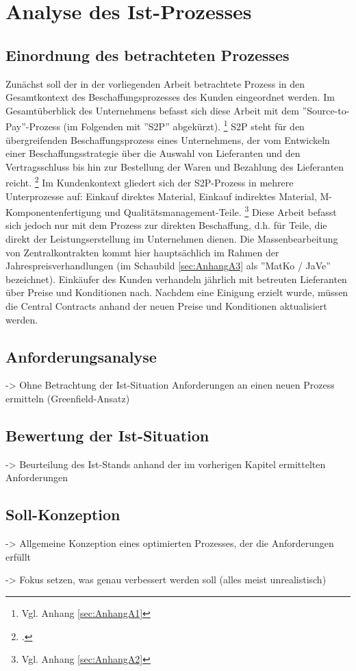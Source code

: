 \chapter{Analyse des Ist-Prozesses}

\section{Einordnung des betrachteten Prozesses}

Zunächst soll der in der vorliegenden Arbeit betrachtete Prozess in den Gesamtkontext des Beschaffungsprozesses des Kunden eingeordnet werden. Im Gesamtüberblick des Unternehmens befasst sich diese Arbeit mit dem ''Source-to-Pay''-Prozess (im Folgenden mit ''S2P'' abgekürzt). \footnote{Vgl. Anhang \ref{sec:AnhangA1}} S2P steht für den übergreifenden Beschaffungsprozess eines Unternehmens, der vom Entwickeln einer Beschaffungsstrategie über die Auswahl von Lieferanten und den Vertragsschluss bis hin zur Bestellung der Waren und Bezahlung des Lieferanten reicht. \footcite[Vgl.][S. 3]{praxis_jain_source_pay_definition_2017} Im Kundenkontext gliedert sich der S2P-Prozess in mehrere Unterprozesse auf: Einkauf direktes Material, Einkauf indirektes Material, M-Komponentenfertigung und Qualitätsmanagement-Teile. \footnote{Vgl. Anhang \ref{sec:AnhangA2}} Diese Arbeit befasst sich jedoch nur mit dem Prozess zur direkten Beschaffung, d.h. für Teile, die direkt der Leistungserstellung im Unternehmen dienen. Die Massenbearbeitung von Zentralkontrakten kommt hier hauptsächlich im Rahmen der Jahrespreisverhandlungen (im Schaubild \ref{sec:AnhangA3} als ''MatKo / JaVe'' bezeichnet). Einkäufer des Kunden verhandeln jährlich mit betreuten Lieferanten über Preise und Konditionen nach. Nachdem eine Einigung erzielt wurde, müssen die Central Contracts anhand der neuen Preise und Konditionen aktualisiert werden. 

\section{Anforderungsanalyse}

-> Ohne Betrachtung der Ist-Situation Anforderungen an einen neuen Prozess ermitteln (Greenfield-Ansatz)

\section{Bewertung der Ist-Situation}

-> Beurteilung des Ist-Stands anhand der im vorherigen Kapitel ermittelten Anforderungen

\section{Soll-Konzeption}

-> Allgemeine Konzeption eines optimierten Prozesses, der die Anforderungen erfüllt

-> Fokus setzen, was genau verbessert werden soll (alles meist unrealistisch)